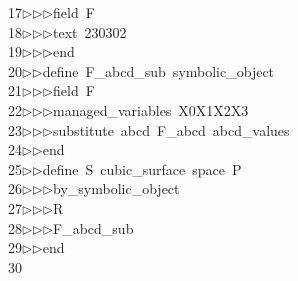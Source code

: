 \begin{tabbing}
17\>$\triangleright$\>$\triangleright$\>$\triangleright$\>field\ F\ \\[0pt]
18\>$\triangleright$\>$\triangleright$\>$\triangleright$\>text\ 230302\ \\[0pt]
19\>$\triangleright$\>$\triangleright$\>$\triangleright$\>end\ \\[0pt]
20\>$\triangleright$\>$\triangleright$\>define\ F\_abcd\_sub\ symbolic\_object\ \\[0pt]
21\>$\triangleright$\>$\triangleright$\>$\triangleright$\>field\ F\ \\[0pt]
22\>$\triangleright$\>$\triangleright$\>$\triangleright$\>managed\_variables\ X0X1X2X3\ \\[0pt]
23\>$\triangleright$\>$\triangleright$\>$\triangleright$\>substitute\ abcd\ F\_abcd\ abcd\_values\ \\[0pt]
24\>$\triangleright$\>$\triangleright$\>end\ \\[0pt]
25\>$\triangleright$\>$\triangleright$\>define\ S\ cubic\_surface\ space\ P\ \\[0pt]
26\>$\triangleright$\>$\triangleright$\>$\triangleright$\>by\_symbolic\_object\ \\[0pt]
27\>$\triangleright$\>$\triangleright$\>$\triangleright$\>R\ \\[0pt]
28\>$\triangleright$\>$\triangleright$\>$\triangleright$\>F\_abcd\_sub\ \\[0pt]
29\>$\triangleright$\>$\triangleright$\>end\\[0pt]
30\>\end{tabbing}
